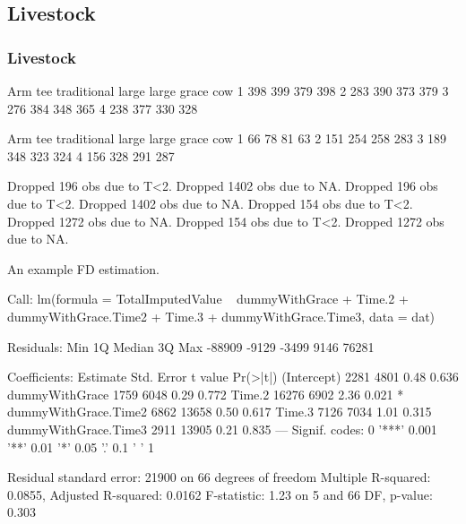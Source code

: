 \subsection{Livestock}

\subsubsection{Livestock}


\begin{Schunk}
\begin{Soutput}
   Arm
tee traditional large large grace cow
  1         398   399         379 398
  2         283   390         373 379
  3         276   384         348 365
  4         238   377         330 328
\end{Soutput}
\begin{Soutput}
   Arm
tee traditional large large grace cow
  1          66    78          81  63
  2         151   254         258 283
  3         189   348         323 324
  4         156   328         291 287
\end{Soutput}
\begin{Soutput}
Dropped 196 obs due to T<2.
Dropped 1402 obs due to NA.
Dropped 196 obs due to T<2.
Dropped 1402 obs due to NA.
Dropped 154 obs due to T<2.
Dropped 1272 obs due to NA.
Dropped 154 obs due to T<2.
Dropped 1272 obs due to NA.
\end{Soutput}
\end{Schunk}
An example FD estimation.
\begin{Schunk}
\begin{Soutput}

Call:
lm(formula = TotalImputedValue ~ dummyWithGrace + Time.2 + dummyWithGrace.Time2 + 
    Time.3 + dummyWithGrace.Time3, data = dat)

Residuals:
   Min     1Q Median     3Q    Max 
-88909  -9129  -3499   9146  76281 

Coefficients:
                     Estimate Std. Error t value Pr(>|t|)  
(Intercept)              2281       4801    0.48    0.636  
dummyWithGrace           1759       6048    0.29    0.772  
Time.2                  16276       6902    2.36    0.021 *
dummyWithGrace.Time2     6862      13658    0.50    0.617  
Time.3                   7126       7034    1.01    0.315  
dummyWithGrace.Time3     2911      13905    0.21    0.835  
---
Signif. codes:  0 '***' 0.001 '**' 0.01 '*' 0.05 '.' 0.1 ' ' 1

Residual standard error: 21900 on 66 degrees of freedom
Multiple R-squared:  0.0855,	Adjusted R-squared:  0.0162 
F-statistic: 1.23 on 5 and 66 DF,  p-value: 0.303
\end{Soutput}
\end{Schunk}

